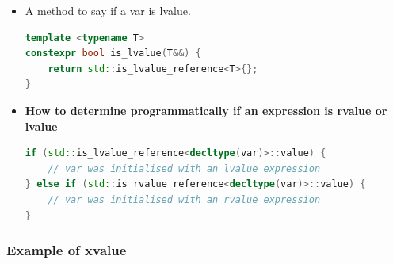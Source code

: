 \documentclass[a4paper,12pt,twoside]{book}
\begin{document}
\begin{itemize}
\item A method to say if a var is lvalue.
\begin{lstlisting}[frame=single, language=c++]
template <typename T>
constexpr bool is_lvalue(T&&) {
	return std::is_lvalue_reference<T>{};
}
\end{lstlisting}

\item \textbf{How to determine programmatically if an expression is rvalue or lvalue}
\begin{lstlisting}[frame=single, language=c++]
if (std::is_lvalue_reference<decltype(var)>::value) {
	// var was initialised with an lvalue expression
} else if (std::is_rvalue_reference<decltype(var)>::value) {
	// var was initialised with an rvalue expression
}
\end{lstlisting}

\end{itemize}

\subsubsection{Example of xvalue}
\end{document}
